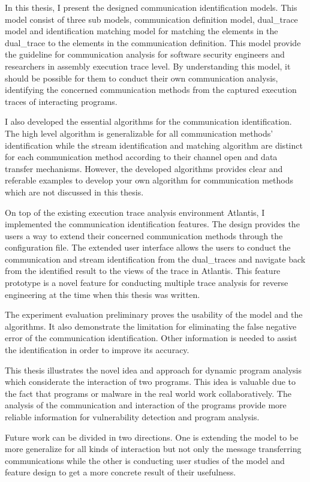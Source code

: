 \label{concl}
In this thesis, I present the designed communication identification models. This model consist of three sub models, communication definition model, dual\_trace model and identification matching model for matching the elements in the dual\_trace to the elements in the communication definition. This model provide the guideline for communication analysis for software security engineers and researchers in assembly execution trace level. By understanding this model, it should be possible for them to conduct their own communication analysis, identifying the concerned communication methods from the captured execution traces of interacting programs.

I also developed the essential algorithms for the communication identification. The high level algorithm is generalizable for all communication methods' identification while  the stream identification and matching algorithm are distinct for each communication method according to their channel open and data transfer mechanisms. However, the developed algorithms provides clear and referable examples to develop your own algorithm for communication methods which are not discussed in this thesis.

On top of the existing execution trace analysis environment Atlantis, I implemented the communication identification features. The design provides the users a way to extend their concerned communication methods through the configuration file. The extended user interface allows the users to conduct the communication and stream identification from the dual\_traces and navigate back from the identified result to the views of the trace in Atlantis. This feature prototype is a novel feature for conducting multiple trace analysis for reverse engineering at the time when this thesis was written. 

The experiment evaluation preliminary proves the usability of the model and the algorithms. It also demonstrate the limitation for eliminating the false negative error of the communication identification. Other information is needed to assist the identification in order to improve its accuracy.

This thesis illustrates the novel idea and approach for dynamic program analysis which considerate the interaction of two programs. This idea is valuable due to the fact that programs or malware in the real world work collaboratively. The analysis of the communication and interaction of the programs provide more reliable information for vulnerability detection and program analysis.

Future work can be divided in two directions. One is extending the model to be more generalize for all kinds of interaction but not only the message transferring communications while the other is conducting user studies of the model and feature design to get a more concrete result of their usefulness.

